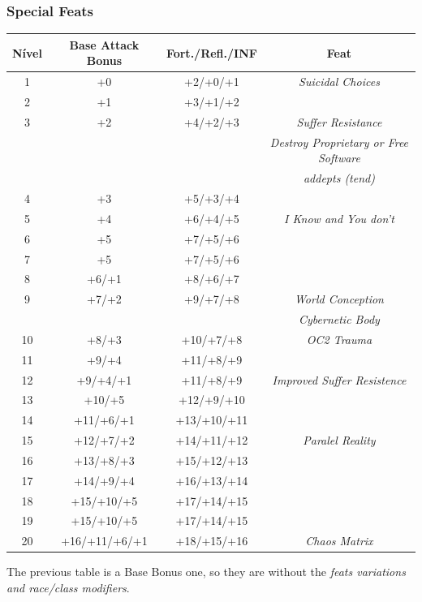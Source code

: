 \documentclass[ letterpaper,12pt]{article}
\begin{document}
\subsubsection{Special Feats}

\begin{center} \begin{tabular}{|c||c|c|c|}
\hline
{\bf Nível}&{\bf Base Attack Bonus}&{\bf Fort./Refl./INF}&{\bf Feat}\\
\hline
1&+0&+2/+0/+1&{\it Suicidal Choices}\\
\hline
2&+1&+3/+1/+2&\\
\hline
3&+2&+4/+2/+3&{\it Suffer Resistance}\\
&&&{\it Destroy Proprietary or Free Software}\\
&&&{\it addepts (tend)}\\
\hline
4&+3&+5/+3/+4&\\
\hline
5&+4&+6/+4/+5&{\it I Know and You don't}\\
\hline
6&+5&+7/+5/+6&\\
\hline
7&+5&+7/+5/+6&{}\\
\hline
8&+6/+1&+8/+6/+7&\\
\hline
9&+7/+2&+9/+7/+8&{\it World Conception}\\
&&&{\it Cybernetic Body}\\
\hline
10&+8/+3&+10/+7/+8&{\it OC2 Trauma}\\
\hline
11&+9/+4&+11/+8/+9&\\
\hline
12&+9/+4/+1&+11/+8/+9&{\it Improved Suffer Resistence}\\
\hline
13&+10/+5&+12/+9/+10&\\
\hline
14&+11/+6/+1&+13/+10/+11&\\
\hline
15&+12/+7/+2&+14/+11/+12&{\it Paralel Reality}\\
\hline
16&+13/+8/+3&+15/+12/+13&\\
\hline
17&+14/+9/+4&+16/+13/+14&\\
\hline
18&+15/+10/+5&+17/+14/+15&\\
\hline
19&+15/+10/+5&+17/+14/+15&\\
\hline
20&+16/+11/+6/+1&+18/+15/+16&{\it Chaos Matrix}\\
\hline
\end{tabular} \end{center}

The previous table is a Base Bonus one, so they are without the {\it feats variations and race/class modifiers}.\\
\end{document}
